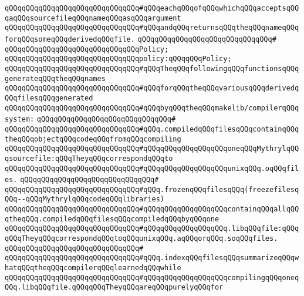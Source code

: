 \verb|qQQqqQQqqQQqqQQqqQQqqQQqqQQqqQQq#qQQqeachqQQqofqQQqwhichqQQqacceptsqQQqaqQQqsourcefileqQQqnameqQQqasqQQqargument|\newline
\verb|qQQqqQQqqQQqqQQqqQQqqQQqqQQqqQQq#qQQqandqQQqreturnsqQQqtheqQQqnameqQQqforqQQqsomeqQQqderivedqQQqfile.|\newline
\verb|qQQqqQQqqQQqqQQqqQQqqQQqqQQqqQQq#|\newline
\verb|qQQqqQQqqQQqqQQqqQQqqQQqqQQqqQQqPolicy;|\newline
\newline
\verb|qQQqqQQqqQQqqQQqqQQqqQQqqQQqqQQqpolicy:qQQqqQQqPolicy;|\newline
\newline
\verb|qQQqqQQqqQQqqQQqqQQqqQQqqQQqqQQq#qQQqTheqQQqfollowingqQQqfunctionsqQQqgenerateqQQqtheqQQqnames|\newline
\verb|qQQqqQQqqQQqqQQqqQQqqQQqqQQqqQQq#qQQqforqQQqtheqQQqvariousqQQqderivedqQQqfilesqQQqgenerated|\newline
\verb|qQQqqQQqqQQqqQQqqQQqqQQqqQQqqQQq#qQQqbyqQQqtheqQQqmakelib/compilerqQQqsystem:|\newline
\verb|qQQqqQQqqQQqqQQqqQQqqQQqqQQqqQQq#|\newline
\verb|qQQqqQQqqQQqqQQqqQQqqQQqqQQqqQQq#qQQq.compiledqQQqfilesqQQqcontainqQQqtheqQQqobjectqQQqcodeqQQqfromqQQqcompiling|\newline
\verb|qQQqqQQqqQQqqQQqqQQqqQQqqQQqqQQq#qQQqqQQqqQQqqQQqqQQqoneqQQqMythrylqQQqsourcefile:qQQqTheyqQQqcorrespondqQQqto|\newline
\verb|qQQqqQQqqQQqqQQqqQQqqQQqqQQqqQQq#qQQqqQQqqQQqqQQqqQQqunixqQQq.oqQQqfiles.|\newline
\verb|qQQqqQQqqQQqqQQqqQQqqQQqqQQqqQQq#|\newline
\verb|qQQqqQQqqQQqqQQqqQQqqQQqqQQqqQQq#qQQq.frozenqQQqfilesqQQq(freezefilesqQQq--qQQqMythrylqQQqcodeqQQqlibraries)|\newline
\verb|qQQqqQQqqQQqqQQqqQQqqQQqqQQqqQQq#qQQqqQQqqQQqqQQqqQQqcontainqQQqallqQQqtheqQQq.compiledqQQqfilesqQQqcompiledqQQqbyqQQqone|\newline
\verb|qQQqqQQqqQQqqQQqqQQqqQQqqQQqqQQq#qQQqqQQqqQQqqQQqqQQq.libqQQqfile:qQQqqQQqTheyqQQqcorrespondqQQqtoqQQqunixqQQq.aqQQqorqQQq.soqQQqfiles.|\newline
\verb|qQQqqQQqqQQqqQQqqQQqqQQqqQQqqQQq#|\newline
\verb|qQQqqQQqqQQqqQQqqQQqqQQqqQQqqQQq#qQQq.indexqQQqfilesqQQqsummarizeqQQqwhatqQQqtheqQQqcompilerqQQqlearnedqQQqwhile|\newline
\verb|qQQqqQQqqQQqqQQqqQQqqQQqqQQqqQQq#qQQqqQQqqQQqqQQqqQQqcompilingqQQqoneqQQq.libqQQqfile.qQQqqQQqTheyqQQqareqQQqpurelyqQQqfor|\newline
